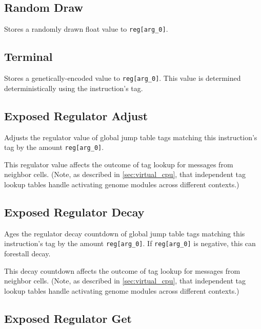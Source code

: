 \subsection{Random Draw}


Stores a randomly drawn float value to \texttt{reg[arg\_0]}.

\subsection{Terminal}


Stores a genetically-encoded value to \texttt{reg[arg\_0]}.
This value is determined deterministically using the instruction's tag.

\subsection{Exposed Regulator Adjust}


Adjusts the regulator value of global jump table tags matching this instruction's tag by the amount \texttt{reg[arg\_0]}.

This regulator value affects the outcome of tag lookup for messages from neighbor cells.
(Note, as described in \ref{sec:virtual_cpu}, that independent tag lookup tables handle activating genome modules across different contexts.)

\subsection{Exposed Regulator Decay}


Ages the regulator decay countdown of global jump table tags matching this instruction's tag by the amount \texttt{reg[arg\_0]}.
If \texttt{reg[arg\_0]} is negative, this can forestall decay. 

This decay countdown affects the outcome of tag lookup for messages from neighbor cells.
(Note, as described in \ref{sec:virtual_cpu}, that independent tag lookup tables handle activating genome modules across different contexts.)

\subsection{Exposed Regulator Get}


